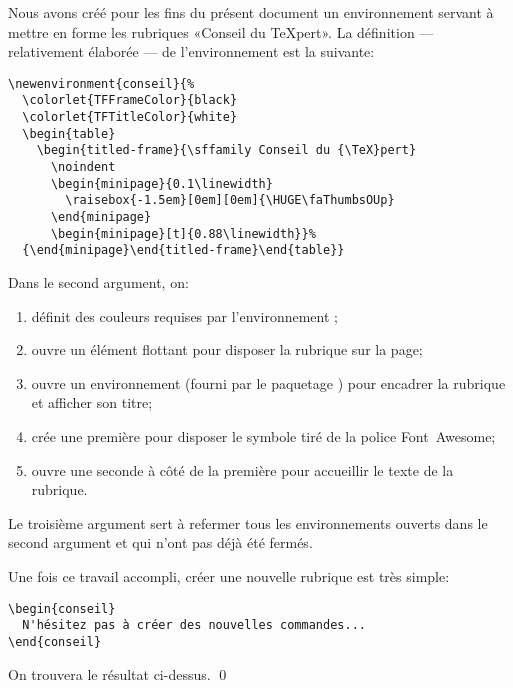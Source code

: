 \begin{exemple}
  Nous avons créé pour les fins du présent document un environnement
   servant à mettre en forme les rubriques «Conseil du
  {\TeX}pert». La définition --- relativement élaborée --- de
  l'environnement est la suivante:
\begin{lstlisting}
\newenvironment{conseil}{%
  \colorlet{TFFrameColor}{black}
  \colorlet{TFTitleColor}{white}
  \begin{table}
    \begin{titled-frame}{\sffamily Conseil du {\TeX}pert}
      \noindent
      \begin{minipage}{0.1\linewidth}
        \raisebox{-1.5em}[0em][0em]{\HUGE\faThumbsOUp}
      \end{minipage}
      \begin{minipage}[t]{0.88\linewidth}}%
  {\end{minipage}\end{titled-frame}\end{table}}
\end{lstlisting}
  Dans le second argument, on:
  \begin{enumerate}
  \item définit des couleurs requises par l'environnement
    ;
  \item ouvre un élément flottant  pour disposer la rubrique sur la
    page;
  \item ouvre un environnement  (fourni par le paquetage
    ) pour encadrer la rubrique et afficher son titre;
  \item crée une première  pour disposer le symbole
    {\faThumbsOUp} tiré de la police Font~Awesome;
  \item ouvre une seconde  à côté de la première pour
    accueillir le texte de la rubrique.
  \end{enumerate}
  Le troisième argument sert à refermer tous les environnements
  ouverts dans le second argument et qui n'ont pas déjà été fermés.

  Une fois ce travail accompli, créer une nouvelle rubrique est très
  simple:
\begin{lstlisting}
\begin{conseil}
  N'hésitez pas à créer des nouvelles commandes...
\end{conseil}
\end{lstlisting}
  On trouvera le résultat ci-dessus. %
  \qed
\end{exemple}

